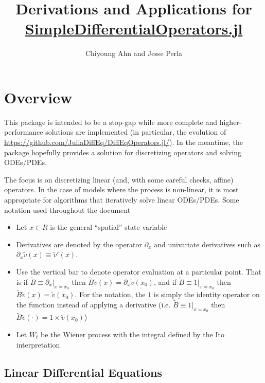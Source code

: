 \documentclass[11pt]{article}
\newcommand{\D}[1][]{\ensuremath{\partial_{#1}}}
\theoremstyle{definition}
\begin{document}
\title{Derivations and Applications for \url{SimpleDifferentialOperators.jl}}
\author{Chiyoung Ahn and Jesse Perla}
\maketitle

\section{Overview}
This package is intended to be a stop-gap while more complete and higher-performance solutions are implemented (in particular, the evolution of \url{https://github.com/JuliaDiffEq/DiffEqOperators.jl/}).  In the meantime, the package hopefully provides a solution for discretizing operators and solving ODEs/PDEs.

The focus is on discretizing linear (and, with some careful checks, affine) operators.  In the case of models where the process is non-linear, it is most appropriate for algorithms that iteratively solve linear ODEs/PDEs.  Some notation used throughout the document
\begin{itemize}
	\item Let $x \in R$ is the general ``spatial'' state  variable

	\item Derivatives are denoted by the operator $\D[x]$ and univariate derivatives such as $\D[x]\tilde{v}(x) \equiv \tilde{v}'(x)$.
	\item Use the vertical bar to denote operator evaluation at a particular point.  That is if $\tilde{B} \equiv \partial_x\vert_{x = x_0}$ then $\tilde{B} \tilde{v}(x) = \partial_x \tilde{v}(x_0)$, and if $\tilde{B} \equiv 1 \vert_{x = x_0}$ then $\tilde{B} \tilde{v}(x) = \tilde{v}(x_0)$.  For the notation, the $1$ is simply the identity operator on the function instead of applying a derivative (i.e. $\tilde{B} \equiv 1 \vert_{x = x_0}$ then $\tilde{B} \tilde{v}(\cdot) = 1 \times \tilde{v}(x_0) $)
	\item Let $W_t$ be the Wiener process with the integral defined by the Ito interpretation

\end{itemize}


\subsection{Linear Differential Equations}
\end{document}

